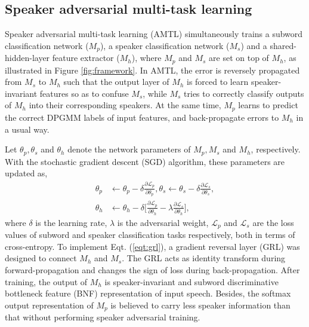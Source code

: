 \documentclass[a4paper]{article}
\begin{document}
\subsection{Speaker adversarial multi-task learning}
\label{subsec:amtl}
Speaker adversarial multi-task learning (AMTL) 
simultaneously trains a subword classification network ($M_p$),
a speaker classification network ($M_s$) and a shared-hidden-layer feature extractor ($M_h$), where $M_p$ and $M_s$ are set on top of $M_h$, as illustrated in Figure \ref{fig:framework}.
In AMTL, the error is reversely propagated from $M_s$ to $M_h$ such that 
the output layer of  $M_h$ is forced to learn   speaker-invariant features so as to confuse $M_s$, while $M_s$ tries to correctly classify outputs of $M_h$ into their corresponding speakers. At the same time, $M_p$ learns to predict the correct DPGMM labels of input features, and back-propagate errors to $M_h$ in a usual way.

Let $\theta_p, \theta_s$ and $\theta_h$ denote the network parameters of
$M_p, M_s$ and $M_h$, respectively.
With the stochastic gradient descent (SGD) algorithm, these parameters are updated as,
\begin{align}
    \theta_p &\leftarrow \theta_p - \delta\frac{\partial \mathcal{L}_{p}}{\partial \theta_p}, 
    \theta_s  \leftarrow \theta_s - \delta \frac{\partial \mathcal{L}_s}{\partial \theta_s}, \\
    \theta_h & \leftarrow \theta_h -\delta \Big[\frac{\partial \mathcal{L}_p}{\partial \theta_h} - \lambda \frac{\partial \mathcal{L}_s}{\partial \theta_h}\Big], \label{eqt:grl}
\end{align}
where $\delta$ is the learning rate, $\lambda$ is the adversarial weight, $\mathcal{L}_p$ and $\mathcal{L}_s$ are the loss values of subword and speaker classification tasks respectively, both in terms of cross-entropy. To implement Eqt. (\ref{eqt:grl}), a gradient reversal layer (GRL) \cite{ganin2015unsupervised} was designed to connect $M_h$ and $M_s$. The GRL acts as identity transform during forward-propagation and changes the sign of loss  during back-propagation. 
After training, the output of $M_h$ is speaker-invariant and subword discriminative bottleneck feature (BNF) representation of input speech. Besides, the softmax output representation of $M_p$ is believed to carry less speaker information than that without performing speaker adversarial training. 
 
\end{document}
